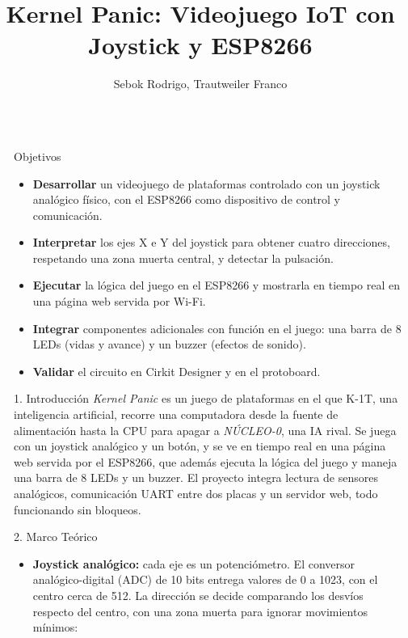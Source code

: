 \documentclass[final]{beamer}
\title{Kernel Panic: Videojuego IoT con Joystick y ESP8266}
\author{Sebok Rodrigo, Trautweiler Franco}
\institute[shortinst]{Universidad Nacional de Hurlingham}
\newlength{\sepwidth}
\newlength{\colwidth}
\newcommand{\separatorcolumn}{\begin{column}{\sepwidth}\end{column}}
\begin{document}
\renewcommand{\figurename}{Figura}
\renewcommand{\tablename}{Cuadro}
\begin{frame}[t]
\begin{columns}[t]
\separatorcolumn

\begin{column}{\colwidth}

  \begin{alertblock}{Objetivos}
    \begin{itemize}
      \item \textbf{Desarrollar} un videojuego de plataformas controlado con un joystick analógico físico, con el ESP8266 como dispositivo de control y comunicación.
      \item \textbf{Interpretar} los ejes X e Y del joystick para obtener cuatro direcciones, respetando una zona muerta central, y detectar la pulsación.
      \item \textbf{Ejecutar} la lógica del juego en el ESP8266 y mostrarla en tiempo real en una página web servida por Wi-Fi.
      \item \textbf{Integrar} componentes adicionales con función en el juego: una barra de 8 LEDs (vidas y avance) y un buzzer (efectos de sonido).
      \item \textbf{Validar} el circuito en Cirkit Designer y en el protoboard.
    \end{itemize}
  \end{alertblock}

  \begin{block}{1. Introducción}
    \textit{Kernel Panic} es un juego de plataformas en el que K-1T, una inteligencia artificial, recorre una computadora desde la fuente de alimentación hasta la CPU para apagar a \textit{NÚCLEO-0}, una IA rival. Se juega con un joystick analógico y un botón, y se ve en tiempo real en una página web servida por el ESP8266, que además ejecuta la lógica del juego y maneja una barra de 8 LEDs y un buzzer. El proyecto integra lectura de sensores analógicos, comunicación UART entre dos placas y un servidor web, todo funcionando sin bloqueos.
  \end{block}

  \begin{block}{2. Marco Teórico}
    \begin{itemize}
      \item \textbf{Joystick analógico:} cada eje es un potenciómetro. El conversor analógico-digital (ADC) de 10 bits entrega valores de 0 a 1023, con el centro cerca de 512. La dirección se decide comparando los desvíos respecto del centro, con una zona muerta para ignorar movimientos mínimos:


\end{itemize}
\end{block}
\end{column}
\end{columns}
\end{frame}
\end{document}

